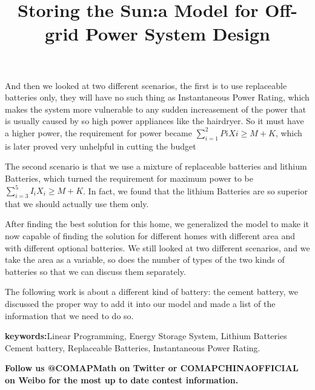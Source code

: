 \documentclass[12pt]{article}
\begin{document}
And then we looked at two different scenarios, the first is to use replaceable  batteries only,
they will have no such thing as Instantaneous Power Rating, which makes the system more vulnerable
to any sudden increasement  of the power that is usually caused by so high power appliances like
the hairdryer. So it must have a higher power, the requirement for power became $\sum_{i=1}^2PiXi\geq M+K$, which is later proved very unhelpful in cutting the budget

The second scenario is that we use a mixture of replaceable batteries and lithium Batteries, which
turned the requirement for maximum power to be $\sum_{i=3}^5I_iX_i\geq M+K$. In fact, we found that the lithium Batteries are so superior that we should actually use them only.

After finding the best solution for this home, we generalized the model to make it now capable of finding the solution for different homes with different area and with different optional batteries.
We still looked at two different scenarios, and we take the area as a variable, so does the number of types of the two kinds of batteries so that we can discuss them separately.

The following work is about a different kind of battery: the cement battery, we discussed the proper way to add it into our model and made a list of the information that we need to do so.
\newline \begin{center}
    \textbf{keywords:}\Large Linear Programming, Energy Storage System, Lithium Batteries Cement battery, Replaceable Batteries, Instantaneous Power Rating.

\end{center}
\textbf{Follow us @COMAPMath on Twitter or COMAPCHINAOFFICIAL on Weibo for the \newline
    most up to date contest information.}



\clearpage
\pagestyle{fancy}
\newpage
\setcounter{page}{1}
\title{Storing the Sun:a Model for Off-grid Power System Design}
\Large
\maketitle
\tableofcontents   %
\newpage
\end{document}
